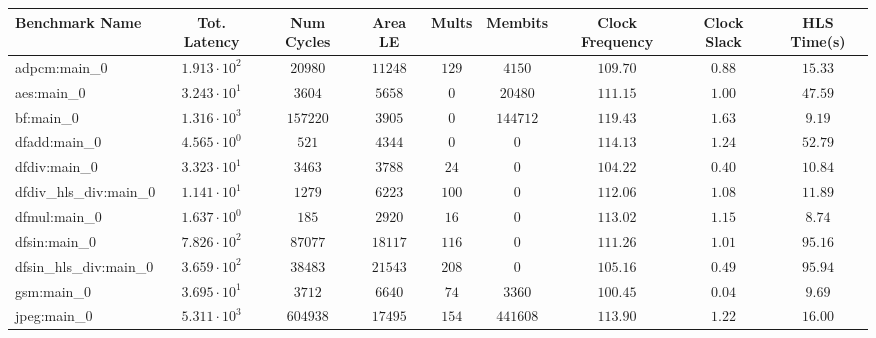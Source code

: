 \begin{tabular}{|l|c|c|c|c|c|c|c|c|}
\hline
Benchmark Name          & Tot. Latency           & Num Cycles  & Area LE    & Mults   & Membits    & Clock Frequency & Clock Slack & HLS Time(s) \\
\hline
adpcm:main\_0           & $ 1.913 \cdot 10^{2} $ & $ 20980   $ & $ 11248  $ & $ 129 $ & $ 4150   $ & $ 109.70      $ & $ 0.88    $ & $ 15.33   $ \\
aes:main\_0             & $ 3.243 \cdot 10^{1} $ & $ 3604    $ & $ 5658   $ & $ 0   $ & $ 20480  $ & $ 111.15      $ & $ 1.00    $ & $ 47.59   $ \\
bf:main\_0              & $ 1.316 \cdot 10^{3} $ & $ 157220  $ & $ 3905   $ & $ 0   $ & $ 144712 $ & $ 119.43      $ & $ 1.63    $ & $ 9.19    $ \\
dfadd:main\_0           & $ 4.565 \cdot 10^{0} $ & $ 521     $ & $ 4344   $ & $ 0   $ & $ 0      $ & $ 114.13      $ & $ 1.24    $ & $ 52.79   $ \\
dfdiv:main\_0           & $ 3.323 \cdot 10^{1} $ & $ 3463    $ & $ 3788   $ & $ 24  $ & $ 0      $ & $ 104.22      $ & $ 0.40    $ & $ 10.84   $ \\
dfdiv\_hls\_div:main\_0 & $ 1.141 \cdot 10^{1} $ & $ 1279    $ & $ 6223   $ & $ 100 $ & $ 0      $ & $ 112.06      $ & $ 1.08    $ & $ 11.89   $ \\
dfmul:main\_0           & $ 1.637 \cdot 10^{0} $ & $ 185     $ & $ 2920   $ & $ 16  $ & $ 0      $ & $ 113.02      $ & $ 1.15    $ & $ 8.74    $ \\
dfsin:main\_0           & $ 7.826 \cdot 10^{2} $ & $ 87077   $ & $ 18117  $ & $ 116 $ & $ 0      $ & $ 111.26      $ & $ 1.01    $ & $ 95.16   $ \\
dfsin\_hls\_div:main\_0 & $ 3.659 \cdot 10^{2} $ & $ 38483   $ & $ 21543  $ & $ 208 $ & $ 0      $ & $ 105.16      $ & $ 0.49    $ & $ 95.94   $ \\
gsm:main\_0             & $ 3.695 \cdot 10^{1} $ & $ 3712    $ & $ 6640   $ & $ 74  $ & $ 3360   $ & $ 100.45      $ & $ 0.04    $ & $ 9.69    $ \\
jpeg:main\_0            & $ 5.311 \cdot 10^{3} $ & $ 604938  $ & $ 17495  $ & $ 154 $ & $ 441608 $ & $ 113.90      $ & $ 1.22    $ & $ 16.00   $ \\

\end{tabular}
